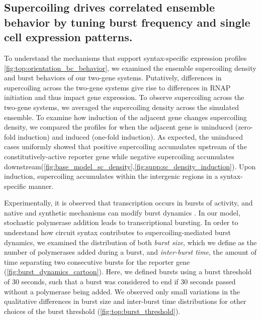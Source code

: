 \documentclass[11pt]{article}
\begin{document}
\FloatBarrier
\subsection{Supercoiling drives correlated ensemble behavior by tuning burst frequency and single cell expression patterns.}

To understand the mechanisms that support syntax-specific expression profiles \cref{fig:top:orientation_bc_behavior}, we examined the ensemble supercoiling density and burst behaviors of our two-gene systems. Putatively, differences in supercoiling across the two-gene systems give rise to differences in RNAP initiation and thus impact gene expression. To observe supercoiling across the two-gene systems, we averaged the supercoiling density across the simulated ensemble. To examine how induction of the adjacent gene changes supercoiling density, we compared the profiles for when the adjacent gene is uninduced (zero-fold induction) and induced (one-fold induction). As expected, the uninduced cases uniformly showed that positive supercoiling accumulates upstream of the constitutively-active reporter gene while negative supercoiling accumulates downstream(\cref{fig:base_model_sc_density},\cref{fig:supp:sc_density_induction}). Upon induction, supercoiling accumulates within the intergenic regions in a syntax-specific manner.

Experimentally, it is observed that transcription occurs in bursts of activity, and native and synthetic mechanisms can modify burst dynamics \parencite{desaiDNArepairPathwayCan2021,chongMechanismTranscriptionalBursting2014,poppAlteringTranscriptionFactor2021}.
In our model, stochastic polymerase addition leads to transcriptional bursting. In order to understand how circuit syntax contributes to supercoiling-mediated burst dynamics, we examined the distribution of both \emph{burst size}, which we define as the number of polymerases added during a burst, and \emph{inter-burst time}, the amount of time separating two consecutive bursts for the reporter gene (\cref{fig:burst_dynamics_cartoon}). Here, we defined bursts using a burst threshold of 30 seconds, such that a burst was considered to end if 30 seconds passed without a polymerase being added. We observed only small variations in the qualitative differences in burst size and inter-burst time distributions for other choices of the burst threshold (\cref{fig:top:burst_threshold}).
\end{document}
